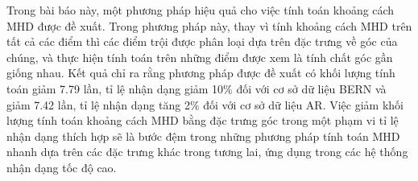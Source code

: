 \documentclass[runningheads]{llncs}
\begin{document}
Trong bài báo này, một phương pháp hiệu quả cho việc tính toán khoảng cách MHD được đề xuất. Trong phương pháp này, thay vì tính khoảng cách MHD trên tất cả các điểm thì các điểm trội được phân loại dựa trên đặc trưng về góc của chúng, và thực hiện tính toán trên những điểm được xem là tính chất góc gần giống nhau. Kết quả chỉ ra rằng phương pháp được đề xuất có khối lượng tính toán giảm 7.79 lần, tỉ lệ nhận dạng giảm 10\% đối với cơ sở dữ liệu BERN và giảm 7.42 lần, tỉ lệ nhận dạng tăng 2\% đối với cơ sở dữ liệu AR. Việc giảm khối lượng tính toán khoảng cách MHD bằng đặc trưng góc trong một phạm vi tỉ lệ nhận dạng thích hợp sẽ là bước đệm trong những phương pháp tính toán MHD nhanh dựa trên các đặc trưng khác trong tương lai, ứng dụng trong các hệ thống nhận dạng tốc độ cao.


{}
\end{document}
